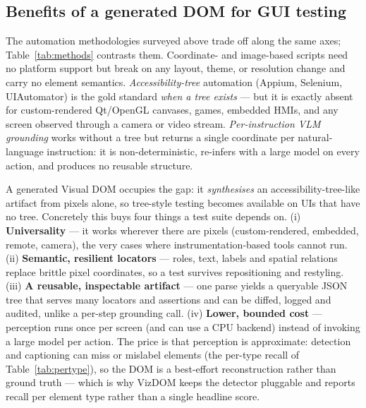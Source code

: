 \documentclass[11pt,a4paper]{article}
\begin{document}
\subsection{Benefits of a generated DOM for GUI testing}
\label{sec:dombenefits}
The automation methodologies surveyed above trade off along the same axes;
Table~\ref{tab:methods} contrasts them. Coordinate- and image-based scripts need no
platform support but break on any layout, theme, or resolution change and carry no
element semantics. \emph{Accessibility-tree} automation (Appium, Selenium,
UIAutomator) is the gold standard \emph{when a tree exists} --- but it is exactly
absent for custom-rendered Qt/OpenGL canvases, games, embedded HMIs, and any screen
observed through a camera or video stream. \emph{Per-instruction VLM grounding}
works without a tree but returns a single coordinate per natural-language
instruction: it is non-deterministic, re-infers with a large model on every action,
and produces no reusable structure.

A generated Visual DOM occupies the gap: it \emph{synthesises} an
accessibility-tree-like artifact from pixels alone, so tree-style testing becomes
available on UIs that have no tree. Concretely this buys four things a test suite
depends on. (i) \textbf{Universality} --- it works wherever there are pixels
(custom-rendered, embedded, remote, camera), the very cases where
instrumentation-based tools cannot run. (ii) \textbf{Semantic, resilient locators}
--- roles, text, labels and spatial relations replace brittle pixel coordinates, so
a test survives repositioning and restyling. (iii) \textbf{A reusable, inspectable
artifact} --- one parse yields a queryable JSON tree that serves many locators and
assertions and can be diffed, logged and audited, unlike a per-step grounding call.
(iv) \textbf{Lower, bounded cost} --- perception runs once per screen (and can use a
CPU backend) instead of invoking a large model per action. The price is that
perception is approximate: detection and captioning can miss or mislabel elements
(the per-type recall of Table~\ref{tab:pertype}), so the DOM is a best-effort
reconstruction rather than ground truth --- which is why VizDOM keeps the detector
pluggable and reports recall per element type rather than a single headline score.
\end{document}
